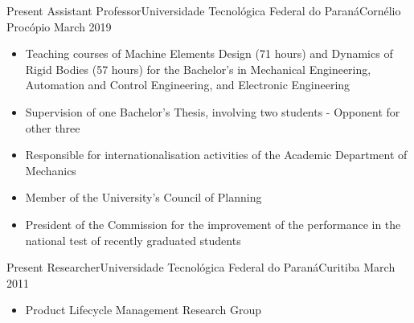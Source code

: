 %
%
%
\begin{experiences}
  \experience
    {Present}   {Assistant Professor}{Universidade Tecnológica Federal do Paraná}{Cornélio Procópio}
    {March 2019} {
                      \begin{itemize}
                        \item Teaching courses of Machine Elements Design (71 hours) and Dynamics of Rigid Bodies (57 hours) for the Bachelor's in Mechanical Engineering, Automation and Control Engineering, and Electronic Engineering
                        \item Supervision of one Bachelor's Thesis, involving two students - Opponent for other three
                        \item Responsible for internationalisation activities of the Academic Department of Mechanics                     
                        \item Member of the University's Council of Planning
                        \item President of the Commission for the improvement of the performance in the national test of recently graduated students
                      \end{itemize}
                    }
                    
  \emptySeparator
  
    \experience
    {Present}   {Researcher}{Universidade Tecnológica Federal do Paraná}{Curitiba}
    {March 2011} {
                      \begin{itemize}
                        \item Product Lifecycle Management Research Group
                      \end{itemize}
                    }
                    
  \emptySeparator
  

\end{experiences}
